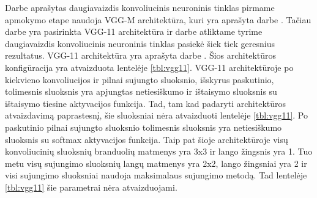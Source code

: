Darbe \cite{cnnExp1} aprašytas daugiavaizdis konvoliucinis neuroninis tinklas pirmame apmokymo etape naudoja VGG-M architektūra, kuri yra aprašyta darbe \cite{vggM}. Tačiau darbe \cite{cnnExp2} yra pasirinkta VGG-11 architektūra ir darbe \cite{cnnExp2} atliktame tyrime  daugiavaizdis konvoliucinis neuroninis tinklas pasiekė šiek tiek geresnius rezultatus. VGG-11 architektūra yra aprašyta darbe \cite{vgg11}. Šios architektūros konfigūracija yra atvaizduota lentelėje \ref{tbl:vgg11}. VGG-11 architektūroje po kiekvieno konvoliucijos ir pilnai sujungto sluoksnio, išskyrus paskutinio, tolimesnis sluoksnis yra apjungtas netiesiškumo ir ištaisymo sluoksnis su ištaisymo tiesine aktyvacijos funkcija. Tad, tam kad padaryti architektūros atvaizdavimą paprastesnį, šie sluoksniai nėra atvaizduoti lentelėje \ref{tbl:vgg11}. Po paskutinio pilnai sujungto sluoksnio tolimesnis sluoksnis yra netiesiškumo sluoksnis su softmax aktyvacijos funkcija. Taip pat šioje architektūroje visų konvoliucinių sluoksnių branduolių matmenys yra 3x3 ir lango žingsnis yra 1. Tuo metu visų sujungimo sluoksnių langų matmenys yra 2x2, lango žingsniai yra 2 ir visi sujungimo sluoksniai naudoja maksimalaus sujungimo metodą. Tad lentelėje \ref{tbl:vgg11} šie parametrai nėra atvaizduojami.

